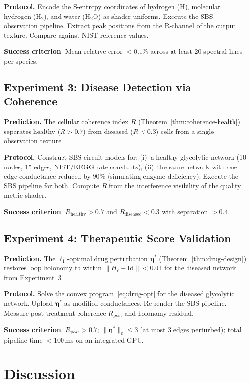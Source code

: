 \documentclass[11pt,twocolumn,a4paper]{article}
\begin{document}
\textbf{Protocol.}  Encode the S-entropy coordinates of hydrogen (H),
molecular hydrogen (H$_2$), and water (H$_2$O) as shader uniforms.
Execute the SBS observation pipeline.  Extract peak positions from the
R-channel of the output texture.  Compare against NIST reference
values.

\textbf{Success criterion.}  Mean relative error $< 0.1\%$ across at
least 20 spectral lines per species.

\subsection{Experiment 3: Disease Detection via Coherence}

\textbf{Prediction.}  The cellular coherence index $R$
(Theorem~\ref{thm:coherence-health}) separates healthy ($R > 0.7$)
from diseased ($R < 0.3$) cells from a single observation texture.

\textbf{Protocol.}  Construct SBS circuit models for: (i)~a healthy
glycolytic network (10 nodes, 15 edges, NIST/KEGG rate constants);
(ii)~the same network with one edge conductance reduced by 90\%
(simulating enzyme deficiency).  Execute the SBS pipeline for both.
Compute $R$ from the interference visibility of the quality metric
shader.

\textbf{Success criterion.}  $R_{\mathrm{healthy}} > 0.7$ and
$R_{\mathrm{diseased}} < 0.3$ with separation $> 0.4$.

\subsection{Experiment 4: Therapeutic Score Validation}

\textbf{Prediction.}  The $\ell_1$-optimal drug perturbation
$\boldsymbol{\eta}^*$ (Theorem~\ref{thm:drug-design}) restores loop
holonomy to within $\|H_\ell - \mathrm{Id}\| < 0.01$ for the diseased
network from Experiment~3.

\textbf{Protocol.}  Solve the convex program~\eqref{eq:drug-opt} for
the diseased glycolytic network.  Upload $\boldsymbol{\eta}^*$ as
modified conductances.  Re-render the SBS pipeline.  Measure
post-treatment coherence $R_{\mathrm{post}}$ and holonomy residual.

\textbf{Success criterion.}  $R_{\mathrm{post}} > 0.7$;
$\|\boldsymbol{\eta}^*\|_0 \leq 3$ (at most 3 edges perturbed);
total pipeline time $< 100$\,ms on an integrated GPU.


\section{Discussion}
\label{sec:discussion}
\end{document}
